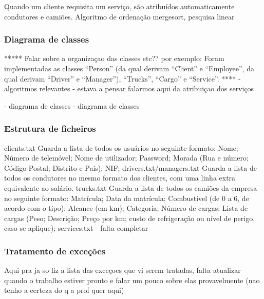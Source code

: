 \documentclass{beamer}
\def\\{}
\begin{document}
\begin{frame}
Quando um cliente requisita um serviço, são atribuídos automaticamente condutores e camiões.
Algoritmo de ordenação mergesort, pesquisa linear
\end{frame}

\begin{frame}
\frametitle{Diagrama de classes}
***** Falar sobre a organizaçao das classes etc?? por exemplo: Foram implementadas as classes “Person” (da qual derivam “Client” e “Employee”, da qual derivam “Driver” e “Manager”), “Trucks”, “Cargo” e “Service”.  ****
- algoritmos relevantes - estava a pensar falarmos aqui da atribuiçao dos serviços

- diagrama de classes
- diagrama de classes
\end{frame}

\begin{frame}
\frametitle{Estrutura de ficheiros}
clients.txt\\
Guarda a lista de todos os usuários no seguinte formato: Nome; Número de telemóvel; Nome de utilizador; Password; Morada (Rua e número; Código-Postal; Distrito e País); NIF;\\
drivers.txt/managers.txt\\
Guarda a lista de todos os condutores no mesmo formato dos clientes, com uma linha extra equivalente ao salário.
trucks.txt\\
Guarda a lista de todos os camiões da empresa no seguinte formato: Matrícula; Data da matrícula; Combustível (de 0 a 6, de acordo com o tipo); Alcance (em km); Categoria; Número de cargas; Lista de cargas (Peso; Descrição; Preço por km; custo de refrigeração ou nível de perigo, caso se aplique);
services.txt - falta completar
\end{frame}
 
\begin{frame}
\frametitle{Tratamento de exceções}
Aqui pra ja so fiz a lista das exceçoes que vi serem tratadas, falta atualizar quando o trabalho estiver pronto e falar um pouco sobre elas provavelmente (nao tenho a certeza do q a prof quer aqui)
\end{frame}
\end{document}
